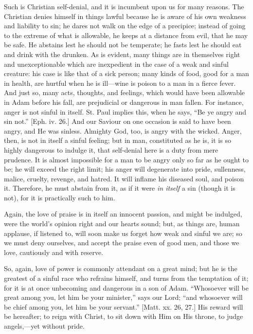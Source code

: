Such is Christian self-denial, and it is incumbent upon us for many
reasons. The Christian denies himself in things lawful because he is
aware of his own weakness and liability to sin; he dares not walk on
the edge of a precipice; instead of going to the extreme of what is
allowable, he keeps at a distance from evil, that he may be safe. He
abstains lest he should not be temperate; he fasts lest he should eat
and drink with the drunken. As is evident, many things are in
themselves right and unexceptionable which are inexpedient in the case
of a weak and sinful creature: his case is like that of a sick person;
many kinds of food, good for a man in health, are hurtful when he is
ill—wine is poison to a man in a fierce fever. And just so, many
acts, thoughts, and feelings, which would have been allowable in Adam
before his fall, are prejudicial or dangerous in man fallen. For
instance, anger is not sinful in itself. St. Paul implies this, when
he says, ``Be ye angry and sin not.'' [Eph. iv. 26.] And our
Saviour on one occasion is said to have been angry, and He was
sinless. Almighty God, too, is angry with the wicked. Anger, then, is
not in itself a sinful feeling; but in man, constituted as he is, it
is so highly dangerous to indulge it, that self-denial here is a duty
from mere prudence. It is almost impossible for a man to be angry only
so far as he ought to be; he will exceed the right limit; his anger
will degenerate into pride, sullenness, malice, cruelty, revenge, and
hatred. It will inflame his diseased soul, and poison it. Therefore,
he must abstain from it, as if it were \emph{in itself} a sin (though
it is not), for it is practically such to him.

Again, the love of praise is in itself an innocent passion, and
might be indulged, were the world's opinion right and our hearts
sound; but, as things are, human applause, if listened to, will soon
make us forget how weak and sinful we are; so we must deny ourselves,
and accept the praise even of good men, and those we love, cautiously
and with reserve.

So, again, love of power is commonly attendant on a great mind; but
he is the greatest of a sinful race who refrains himself, and turns
from the temptation of it; for it is at once unbecoming and dangerous
in a son of Adam. ``Whosoever will be great among you, let him be
your minister,'' says our Lord; ``and whosoever will be chief
among you, let him be your servant.'' [Matt. xx. 26, 27.] His
reward will be hereafter; to reign with Christ, to sit down with Him
on His throne, to judge angels,—yet without pride.

